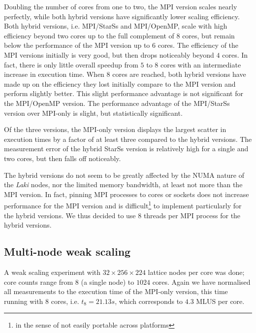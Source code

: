 \documentclass[conference]{IEEEtran}
\newcommand{\starss}{{StarSs}}
\newcommand{\laki}{{\em Laki}}
\begin{document}
Doubling the number of cores from one to two, the MPI version scales
nearly perfectly, while both hybrid versions have significantly lower
scaling efficiency. Both hybrid versions, i.e. MPI/\starss{} and
MPI/OpenMP, scale with high efficiency beyond two cores up to the full
complement of $8$ cores, but remain below the performance of the MPI
version up to $6$ cores. The efficiency of the MPI versions initially
is very good, but then drops noticeably beyond $4$ cores. In fact,
there is only little overall speedup from $5$ to $8$ cores with an
intermediate increase in execution time.  When $8$ cores are reached,
both hybrid versions have made up on the efficiency they lost initially
compare to the MPI version and perform slightly better. This slight
performance advantage is not significant for the MPI/OpenMP
version. The performance advantage of the MPI/\starss{} version over
MPI-only is slight, but statistically significant.

Of the three versions, the MPI-only version displays the largest
scatter in execution times by a factor of at least three compared to
the hybrid versions. The measurement error of the hybrid \starss{}
version is relatively high for a single and two cores, but then falls
off noticeably.

The hybrid versions do not seem to be greatly affected by the NUMA
nature of the \laki{} nodes, nor the limited memory bandwidth, at
least not more than the MPI version. In fact, pinning MPI
processes to cores or sockets does not increase performance for the
MPI version and is difficult\footnote{in the sense of not easily
  portable across platforms} to implement particularly for the hybrid
versions.  We thus decided to use $8$ threads per MPI process for the
hybrid versions.

\subsection*{Multi-node weak scaling}
A weak scaling experiment with
\mbox{$32\times256\times224$} lattice nodes per core was done; core
counts range from $8$ (a single node) to $1024$ cores. Again we have
normalised all measurements to the execution time of the MPI-only
version, this time running with $8$ cores, i.e. $t_8 = 21.13 s$, which
corresponds to $4.3$ MLUS per core.
\end{document}
